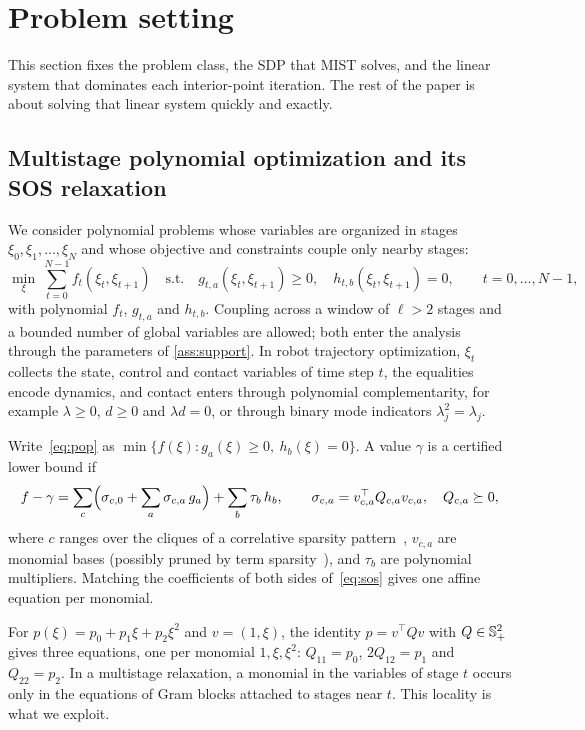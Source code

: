 \section{Problem setting}\label{sec:setting}

This section fixes the problem class, the SDP that MIST solves, and the linear
system that dominates each interior-point iteration. The rest of the paper is
about solving that linear system quickly and exactly.

\subsection{Multistage polynomial optimization and its SOS relaxation}

We consider polynomial problems whose variables are organized in stages
$\xi_0,\xi_1,\ldots,\xi_N$ and whose objective and constraints couple only
nearby stages:
\begin{equation}\label{eq:pop}
\min_{\xi}\ \sum_{t=0}^{N-1}f_t(\xi_t,\xi_{t+1})
\quad\text{s.t.}\quad
g_{t,a}(\xi_t,\xi_{t+1})\ge0,\quad h_{t,b}(\xi_t,\xi_{t+1})=0,\qquad t=0,\ldots,N-1,
\end{equation}
with polynomial $f_t$, $g_{t,a}$ and $h_{t,b}$. Coupling across a window of
$\ell>2$ stages and a bounded number of global variables are allowed; both enter
the analysis through the parameters of \cref{ass:support}. In robot trajectory
optimization, $\xi_t$ collects the state, control and contact variables of time
step $t$, the equalities encode dynamics, and contact enters through polynomial
complementarity, for example $\lambda\ge0$, $d\ge0$ and $\lambda d=0$, or through
binary mode indicators $\lambda_j^2=\lambda_j$.

Write~\eqref{eq:pop} as $\min\{f(\xi):g_a(\xi)\ge0,\ h_b(\xi)=0\}$. A value $\gamma$
is a certified lower bound if
\begin{equation}\label{eq:sos}
f-\gamma=\sum_c\Bigl(\sigma_{c,0}+\sum_{a}\sigma_{c,a}\,g_a\Bigr)+\sum_b\tau_b\,h_b,
\qquad \sigma_{c,a}=v_{c,a}^{\top}Q_{c,a}v_{c,a},\quad Q_{c,a}\succeq0,
\end{equation}
where $c$ ranges over the cliques of a correlative sparsity
pattern~\cite{waki2006sums,lasserre2006convergent}, $v_{c,a}$ are monomial bases
(possibly pruned by term sparsity~\cite{wang2021tssos,wang2022cstssos}), and
$\tau_b$ are polynomial multipliers. Matching the coefficients of both sides
of~\eqref{eq:sos} gives one affine equation per monomial.

\begin{example}\label{ex:matching}
For $p(\xi)=p_0+p_1\xi+p_2\xi^2$ and $v=(1,\xi)$, the identity $p=v^\top Qv$ with
$Q\in\mathbb S^2_+$ gives three equations, one per monomial $1,\xi,\xi^2$:
$Q_{11}=p_0$, $2Q_{12}=p_1$ and $Q_{22}=p_2$. In a multistage relaxation, a
monomial in the variables of stage $t$ occurs only in the equations of Gram
blocks attached to stages near $t$. This locality is what we exploit.
\end{example}

